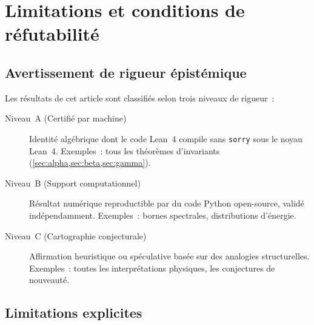 \section{Limitations et conditions de réfutabilité}
\label{sec:limitations}

\subsection{Avertissement de rigueur épistémique}
Les résultats de cet article sont classifiés selon trois niveaux de rigueur~:
\begin{description}
  \item[Niveau~A (Certifié par machine)] Identité algébrique dont le code Lean~4 compile sans \texttt{sorry} sous le noyau Lean~4. Exemples~: tous les théorèmes d'invariants (\cref{sec:alpha,sec:beta,sec:gamma}).
  \item[Niveau~B (Support computationnel)] Résultat numérique reproductible par du code Python open-source, validé indépendamment. Exemples~: bornes spectrales, distributions d'énergie.
  \item[Niveau~C (Cartographie conjecturale)] Affirmation heuristique ou spéculative basée sur des analogies structurelles. Exemples~: toutes les interprétations physiques, les conjectures de nouveauté.
\end{description}

\subsection{Limitations explicites}

